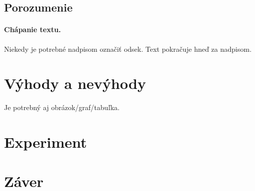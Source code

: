 \documentclass[10pt,twoside,slovak,a4paper]{article}
\begin{document}
\subsection{Porozumenie} \label{mall:porozumenie}

\paragraph{Chápanie textu.}
Niekedy je potrebné nadpisom označiť odsek. Text pokračuje hneď za nadpisom.



\section{Výhody a nevýhody} \label{vyhodyanevyhody}

Je potrebný aj obrázok/graf/tabuľka.



\section{Experiment} \label{experiment}




\section{Záver} \label{zaver} %






\end{document}
